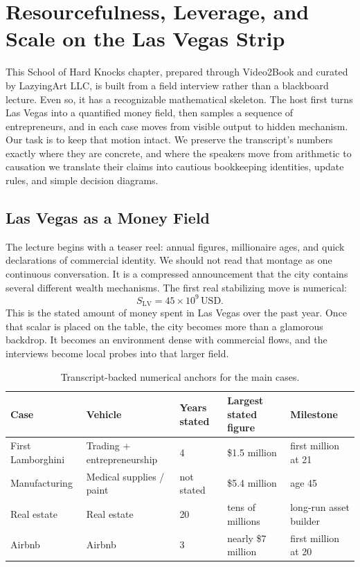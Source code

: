 \chapter{Resourcefulness, Leverage, and Scale on the Las Vegas Strip}

This School of Hard Knocks chapter, prepared through Video2Book and curated by LazyingArt LLC, is built from a field interview rather than a blackboard lecture. Even so, it has a recognizable mathematical skeleton. The host first turns Las Vegas into a quantified money field, then samples a sequence of entrepreneurs, and in each case moves from visible output to hidden mechanism. Our task is to keep that motion intact. We preserve the transcript's numbers exactly where they are concrete, and where the speakers move from arithmetic to causation we translate their claims into cautious bookkeeping identities, update rules, and simple decision diagrams.

\section{Las Vegas as a Money Field}

The lecture begins with a teaser reel: annual figures, millionaire ages, and quick declarations of commercial identity. We should not read that montage as one continuous conversation. It is a compressed announcement that the city contains several different wealth mechanisms. The first real stabilizing move is numerical:
\begin{equation}
S_{\mathrm{LV}} = 45\times 10^9\,\mathrm{USD}.
\end{equation}
This is the stated amount of money spent in Las Vegas over the past year. Once that scalar is placed on the table, the city becomes more than a glamorous backdrop. It becomes an environment dense with commercial flows, and the interviews become local probes into that larger field.

\begin{table}[h]
\centering
\begin{tabular}{|l|l|l|l|l|}
\hline
Case & Vehicle & Years stated & Largest stated figure & Milestone \\
\hline
First Lamborghini & Trading + entrepreneurship & 4 & \$1.5 million & first million at 21 \\
Manufacturing & Medical supplies / paint & not stated & \$5.4 million & age 45 \\
Real estate & Real estate & 20 & tens of millions & long-run asset builder \\
Airbnb & Airbnb & 3 & nearly \$7 million & first million at 20 \\
\hline
\end{tabular}
\caption{Transcript-backed numerical anchors for the main cases.}
\end{table}

